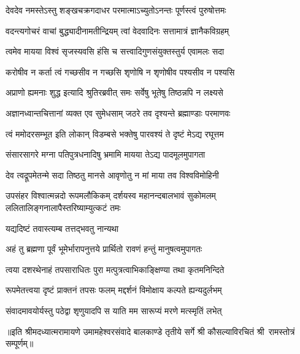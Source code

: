 

\addtocounter{shlokacount}{19}
\twolineshloka
{देवदेव नमस्तेऽस्तु शङ्खचक्रगदाधर}
{परमात्माऽच्युतोऽनन्तः पूर्णस्त्वं पुरुषोत्तमः} %

\twolineshloka
{वदन्त्यगोचरं वाचां बुद्ध्यादीनामतीन्द्रियम्}
{त्वां वेदवादिनः सत्तामात्रं ज्ञानैकविग्रहम्} %

\twolineshloka
{त्वमेव मायया विश्वं सृजस्यवसि हंसि च}
{सत्त्वादिगुणसंयुक्तस्तुर्य एवामलः सदा} %

\twolineshloka
{करोषीव न कर्ता त्वं गच्छसीव न गच्छसि}
{शृणोषि न शृणोषीव पश्यसीव न पश्यसि} %

\twolineshloka
{अप्राणो ह्यमनाः शुद्ध इत्यादि श्रुतिरब्रवीत्}
{समः सर्वेषु भूतेषु तिष्ठन्नपि न लक्ष्यसे} %

\twolineshloka
{अज्ञानध्वान्तचित्तानां व्यक्त एव सुमेधसाम्}
{जठरे तव दृश्यन्ते ब्रह्माण्डाः परमाणवः} %

\twolineshloka
{त्वं ममोदरसम्भूत इति लोकान् विडम्बसे}
{भक्तेषु पारवश्यं ते दृष्टं मेऽद्य रघूत्तम} %

\twolineshloka
{संसारसागरे मग्ना पतिपुत्रधनादिषु}
{भ्रमामि मायया तेऽद्य पादमूलमुपागता} %

\twolineshloka
{देव त्वद्रूपमेतन्मे सदा तिष्ठतु मानसे}
{आवृणोतु न मां माया तव विश्वविमोहिनी} %

\threelineshloka
{उपसंहर विश्वात्मन्नदो रूपमलौकिकम्}
{दर्शयस्व महानन्दबालभावं सुकोमलम्}
{ललितालिङ्गनालापैस्तरिष्याम्युत्कटं तमः} %


\onelineshloka
{यद्यदिष्टं तवास्त्यम्ब तत्तद्भवतु नान्यथा} %

\twolineshloka
{अहं तु ब्रह्मणा पूर्वं भूमेर्भारापनुत्तये}
{प्रार्थितो रावणं हन्तुं मानुषत्वमुपागतः} %

\twolineshloka
{त्वया दशरथेनाहं तपसाराधितः पुरा}
{मत्पुत्रत्वाभिकाङ्क्षिण्या तथा कृतमनिन्दिते} %

\twolineshloka
{रूपमेतत्त्वया दृष्टं प्राक्तनं तपसः फलम्}
{मद्दर्शनं विमोक्षाय कल्पते ह्यन्यदुर्लभम्} %

\twolineshloka
{संवादमावयोर्यस्तु पठेद्वा शृणुयादपि}
{स याति मम सारूप्यं मरणे मत्स्मृतिं लभेत्} %

{॥इति श्रीमदध्यात्मरामायणे उमामहेश्वरसंवादे बालकाण्डे
तृतीये सर्गे श्री कौसल्याविरचितं श्री~रामस्तोत्रं सम्पूर्णम्॥}

